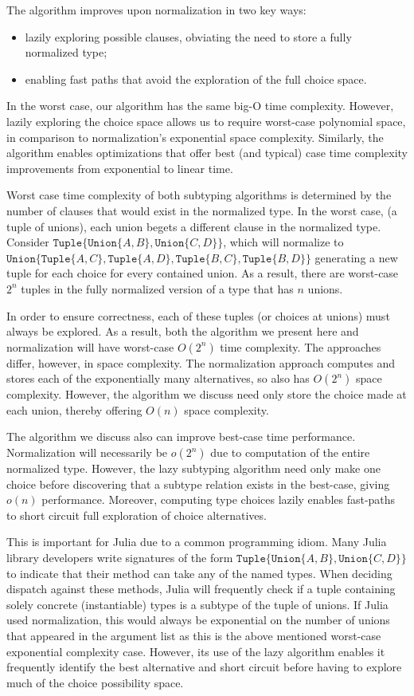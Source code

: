 \documentclass[a4paper,english]{lipics-v2019}
\newcommand{\xt}[1]{\texttt{#1}}
\newcommand{\union}[2]{\xt{Union\{}#1,#2\xt{\}}}
\newcommand{\tuple}[1]{\xt{Tuple\{}#1\xt{\}}}
\begin{document}
The algorithm improves upon normalization in two key ways:
\begin{itemize}
  \item lazily exploring possible clauses, obviating the need to store a fully normalized type;
  \item enabling fast paths that avoid the exploration of the full choice space.
\end{itemize}

In the worst case, our algorithm has the same big-O time complexity. However,
lazily exploring the choice space allows us to require worst-case polynomial
space, in comparison to normalization's exponential space complexity.
Similarly, the algorithm enables optimizations that offer best (and typical)
case time complexity improvements from exponential to linear time.

Worst case time complexity of both subtyping algorithms is determined by the
number of clauses that would exist in the normalized type. In the worst case,
(a tuple of unions), each union begets a different clause in the normalized
type. Consider $\tuple{\union{A}{B}, \union{C}{D}}$, which will normalize to
$\union{\tuple{A,C}}{\tuple{A, D}, \tuple{B, C}, \tuple{B, D}}$ generating a 
new tuple for each choice for every contained union. As a result, there are
worst-case $2^n$ tuples in the fully normalized version of a type that has $n$
unions.

In order to ensure correctness, each of these tuples (or choices at unions)
must always be explored. As a result, both the algorithm we present here and
normalization will have worst-case $O(2^n)$ time complexity. The approaches
differ, however, in space complexity. The normalization approach computes and
stores each of the exponentially many alternatives, so also has $O(2^n)$ space
complexity. However, the algorithm we discuss need only store the choice made
at each union, thereby offering $O(n)$ space complexity.

The algorithm we discuss also can improve best-case time performance.
Normalization will necessarily be $o(2^n)$ due to computation of the entire
normalized type. However, the lazy subtyping algorithm need only make one
choice before discovering that a subtype relation exists in the best-case,
giving $o(n)$ performance. Moreover, computing type choices lazily enables
fast-paths to short circuit full exploration of choice alternatives.

This is important for Julia due to a common programming idiom. Many Julia
library developers write signatures of the form $\tuple{\union{A}{B},
\union{C}{D}}$ to indicate that their method can take any of the named
types. When deciding dispatch against these methods, Julia will frequently
check if a tuple containing solely concrete (instantiable) types is a subtype 
of the tuple of unions. If Julia used normalization, this would always be 
exponential on the number of unions that appeared in the argument list as this
is the above mentioned worst-case exponential complexity case. However, its use
of the lazy algorithm enables it frequently identify the best alternative and
short circuit before having to explore much of the choice possibility space.
\end{document}
